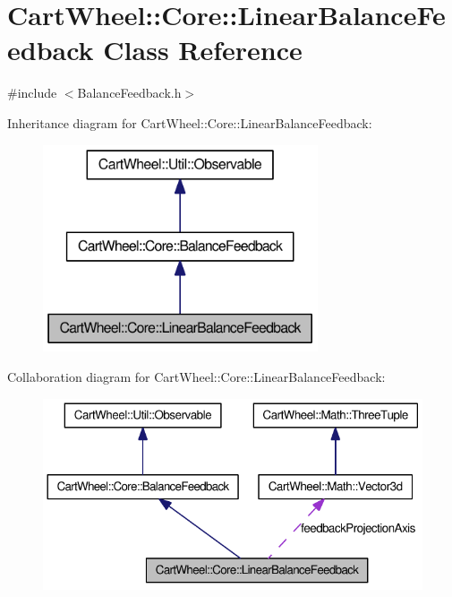 \hypertarget{classCartWheel_1_1Core_1_1LinearBalanceFeedback}{
\section{CartWheel::Core::LinearBalanceFeedback Class Reference}
\label{classCartWheel_1_1Core_1_1LinearBalanceFeedback}
}


{\ttfamily \#include $<$BalanceFeedback.h$>$}



Inheritance diagram for CartWheel::Core::LinearBalanceFeedback:\nopagebreak
\begin{figure}[H]
\begin{center}
\leavevmode
\includegraphics[width=230pt]{classCartWheel_1_1Core_1_1LinearBalanceFeedback__inherit__graph}
\end{center}
\end{figure}


Collaboration diagram for CartWheel::Core::LinearBalanceFeedback:\nopagebreak
\begin{figure}[H]
\begin{center}
\leavevmode
\includegraphics[width=355pt]{classCartWheel_1_1Core_1_1LinearBalanceFeedback__coll__graph}
\end{center}
\end{figure}
